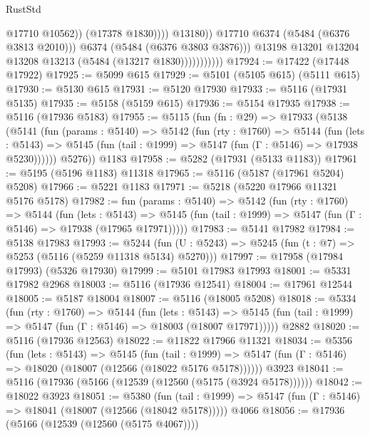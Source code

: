 \begin{lexlean}{RustStd}
\begin{coremodule}
                                        @17710
                                        @10562))
                                    (@17378 @1830))))
                              @13180))
                          @17710
                          @6374
                          (@5484 (@6376 @3813 @2010)))
                        @6374
                        (@5484 (@6376 @3803 @3876)))
                      @13198
                      @13201
                      @13204
                      @13208
                      @13213
                      (@5484 (@13217 @1830)))))))))))
@17924 := @17422 (@17448 @17922)
@17925 := @5099 @615
@17929 := @5101 (@5105 @615) (@5111 @615)
@17930 := @5130 @615
@17931 := @5120 @17930
@17933 := @5116 (@17931 @5135)
@17935 := @5158 (@5159 @615)
@17936 := @5154 @17935
@17938 := @5116 (@17936 @5183)
@17955 := @5115
    (fun (fn : @29) =>
    @17933
      (@5138
        (@5141
          (fun (params : @5140) =>
          @5142
            (fun (rty : @1760) =>
            @5144
              (fun (lets : @5143) =>
              @5145 (fun (tail : @1999) => @5147 (fun (Γ : @5146) => @17938 @5230))))))
        @5276))
    @1183
@17958 := @5282 (@17931 (@5133 @1183))
@17961 := @5195 (@5196 @1183) @11318
@17965 := @5116 (@5187 (@17961 @5204) @5208)
@17966 := @5221 @1183
@17971 := @5218 (@5220 @17966 @11321 @5176 @5178)
@17982 := fun (params : @5140) =>
  @5142
    (fun (rty : @1760) =>
    @5144
      (fun (lets : @5143) =>
      @5145 (fun (tail : @1999) => @5147 (fun (Γ : @5146) => @17938 (@17965 @17971)))))
@17983 := @5141 @17982
@17984 := @5138 @17983
@17993 := @5244
    (fun (U : @5243) => @5245 (fun (t : @7) => @5253 (@5116 (@5259 @11318 @5134) @5270)))
@17997 := @17958 (@17984 @17993) (@5326 @17930)
@17999 := @5101 @17983 @17993
@18001 := @5331 @17982 @2968
@18003 := @5116 (@17936 @12541)
@18004 := @17961 @12544
@18005 := @5187 @18004
@18007 := @5116 (@18005 @5208)
@18018 := @5334
    (fun (rty : @1760) =>
    @5144
      (fun (lets : @5143) =>
      @5145 (fun (tail : @1999) => @5147 (fun (Γ : @5146) => @18003 (@18007 @17971)))))
    @2882
@18020 := @5116 (@17936 @12563)
@18022 := @11822 @17966 @11321
@18034 := @5356
    (fun (lets : @5143) =>
    @5145
      (fun (tail : @1999) =>
      @5147 (fun (Γ : @5146) => @18020 (@18007 (@12566 (@18022 @5176 @5178))))))
    @3923
@18041 := @5116 (@17936 (@5166 (@12539 (@12560 (@5175 (@3924 @5178))))))
@18042 := @18022 @3923
@18051 := @5380
    (fun (tail : @1999) => @5147 (fun (Γ : @5146) => @18041 (@18007 (@12566 (@18042 @5178)))))
    @4066
@18056 := @17936 (@5166 (@12539 (@12560 (@5175 @4067))))

\end{coremodule}
\end{lexlean}
